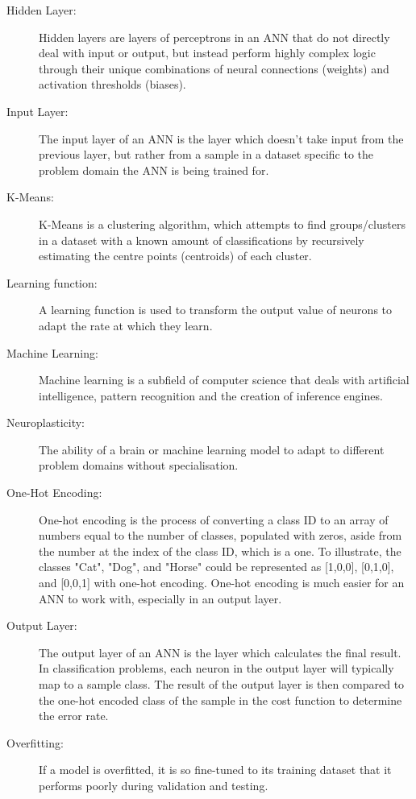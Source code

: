 \documentclass[]{report}
\begin{document}
\begin{description}
\item[Hidden Layer:] Hidden layers are layers of perceptrons in an ANN that do not directly deal with input or output, but instead perform highly complex logic through their unique combinations of neural connections (weights) and activation thresholds (biases).

\item[Input Layer:] The input layer of an ANN is the layer which doesn't take input from the previous layer, but rather from a sample in a dataset specific to the problem domain the ANN is being trained for.

\item[K-Means:] K-Means is a clustering algorithm, which attempts to find groups/clusters in a dataset with a known amount of classifications by recursively estimating the centre points (centroids) of each cluster.

\item[Learning function:] A learning function is used to transform the output value of neurons to adapt the rate at which they learn.

\item[Machine Learning:] Machine learning is a subfield of computer science that deals with artificial intelligence, pattern recognition and the creation of inference engines.

\item[Neuroplasticity:] The ability of a brain or machine learning model to adapt to different problem domains without specialisation.

\item[One-Hot Encoding:] One-hot encoding is the process of converting a class ID to an array of numbers equal to the number of classes, populated with zeros, aside from the number at the index of the class ID, which is a one. To illustrate, the classes "Cat", "Dog", and "Horse" could be represented as [1,0,0], [0,1,0], and [0,0,1] with one-hot encoding. One-hot encoding is much easier for an ANN to work with, especially in an output layer.

\item[Output Layer:] The output layer of an ANN is the layer which calculates the final result. In classification problems, each neuron in the output layer will typically map to a sample class. The result of the output layer is then compared to the one-hot encoded class of the sample in the cost function to determine the error rate.

\item[Overfitting:] If a model is overfitted, it is so fine-tuned to its training dataset that it performs poorly during validation and testing.


\end{description}
\end{document}
